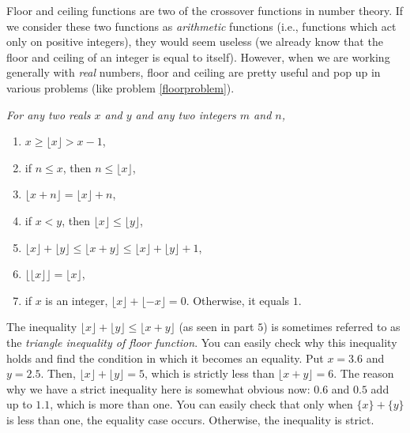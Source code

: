 \documentclass[12pt]{subfile}
\begin{document}
	    \begin{note}
	        Floor and ceiling functions are two of the crossover functions in number theory. If we consider these two functions as \textit{arithmetic} functions (i.e., functions which act only on positive integers), they would seem useless (we already know that the floor and ceiling of an integer is equal to itself). However, when we are working generally with \textit{real} numbers, floor and ceiling are pretty useful and pop up in various problems (like problem \ref{floorproblem}).
	    \end{note}

        \begin{proposition}\slshape \label{prop:floor}
        	For any two reals $x$ and $y$ and any two integers $m$ and $n$,
        	\begin{enumerate}[1.]
        		\item $x\geq\lfloor x\rfloor>x-1$,
        		\item if $n \leq x$, then $n \leq \lfloor x \rfloor$,
        		\item $\lfloor x+n\rfloor=\lfloor x\rfloor+n$,
        		\item if $x <y$, then $\lfloor x \rfloor \leq \lfloor y \rfloor$,
        		\item $\lfloor x\rfloor+\lfloor y \rfloor\leq \lfloor x+y\rfloor \leq \lfloor x\rfloor+\lfloor y\rfloor+1$,
        		\item $\lfloor \lfloor x\rfloor\rfloor  =  \lfloor x\rfloor$,
        		\item if $x$ is an integer, $\lfloor x\rfloor+\lfloor -x\rfloor=0$. Otherwise, it equals $1$.
        	\end{enumerate}
        \end{proposition}

        \begin{example}
        	The inequality $\lfloor x\rfloor+\lfloor y\rfloor \leq \lfloor x+y\rfloor$ (as seen in part $5$) is sometimes referred to as the \textit{triangle inequality of floor function}. You can easily check why this inequality holds and find the condition in which it becomes an equality. Put $x=3.6$ and $y=2.5$. Then, $\lfloor x\rfloor+\lfloor y\rfloor = 5$, which is strictly less than $\lfloor x+y\rfloor=6$. The reason why we have a strict inequality here is somewhat obvious now: $0.6$ and $0.5$ add up to $1.1$, which is more than one. You can easily check that only when $\{x\} + \{y\}$ is less than one, the equality case occurs. Otherwise, the inequality is strict.
        \end{example}
\end{document}
